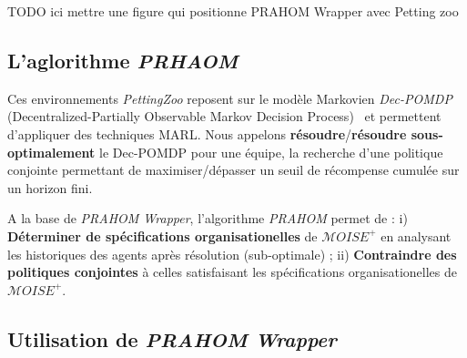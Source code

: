\documentclass[demonstration]{jfsma}
\newcommand{\probP}{\text{I\kern-0.15em P}}
\begin{document}
TODO ici mettre une figure qui positionne PRAHOM Wrapper avec Petting zoo

\subsection{L'aglorithme \emph{PRHAOM}}


Ces environnements \emph{PettingZoo} reposent sur le modèle Markovien \emph{Dec-POMDP} (Decentralized-Partially Observable Markov Decision Process)~\cite{Oliehoek2016} et permettent d'appliquer des techniques MARL. 
Nous appelons \textbf{résoudre}/\textbf{résoudre sous-optimalement} le Dec-POMDP pour une équipe, la recherche d'une politique conjointe permettant de maximiser/dépasser un seuil de récompense cumulée sur un horizon fini.

A la base de \emph{PRAHOM Wrapper}, l'algorithme \emph{PRAHOM} permet de :
i) \textbf{Déterminer de spécifications organisationelles} de $\mathcal{M}OISE^+$ en analysant les historiques des agents après résolution (sub-optimale) ;
ii) \textbf{Contraindre des politiques conjointes} à celles satisfaisant les spécifications organisationelles de $\mathcal{M}OISE^+$.








\subsection{Utilisation de \emph{PRAHOM Wrapper}}
\end{document}
